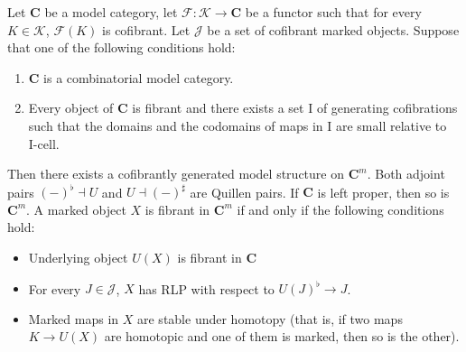 \documentclass[reqno]{amsart}
\theoremstyle{definition}
\theoremstyle{remark}
\newcommand{\cat}[1]{\mathbf{#1}}
\newcommand{\C}{\cat{C}}
\newcommand{\I}{\mathrm{I}}
\newcommand{\class}[2]{#1\text{-}\mathrm{#2}}
\newcommand{\Icell}[1][\I]{\class{#1}{cell}}
\numberwithin{figure}{section}
\begin{document}
\begin{thm}
Let $\C$ be a model category, let $\mathcal{F} : \mathcal{K} \to \C$ be a functor such that for every $K \in \mathcal{K}$, $\mathcal{F}(K)$ is cofibrant.
Let $\mathcal{J}$ be a set of cofibrant marked objects.
Suppose that one of the following conditions hold:
\begin{enumerate}
\item \label{it:comb} $\C$ is a combinatorial model category.
\item \label{it:all-fib} Every object of $\C$ is fibrant and there exists a set $\I$ of generating cofibrations such that
the domains and the codomains of maps in $\I$ are small relative to $\Icell$.
\end{enumerate}
Then there exists a cofibrantly generated model structure on $\C^m$.
Both adjoint pairs $(-)^\flat \dashv U$ and $U \dashv (-)^\sharp$ are Quillen pairs.
If $\C$ is left proper, then so is $\C^m$.
A marked object $X$ is fibrant in $\C^m$ if and only if the following conditions hold:
\begin{itemize}
\item Underlying object $U(X)$ is fibrant in $\C$
\item For every $J \in \mathcal{J}$, $X$ has RLP with respect to $U(J)^\flat \to J$.
\item Marked maps in $X$ are stable under homotopy (that is, if two maps $K \to U(X)$ are homotopic and one of them is marked, then so is the other).
\end{itemize}
\end{thm}
\end{document}
